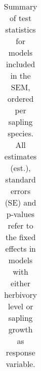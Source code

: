 \documentclass[10pt, twoside]{book} %
\begin{document}
\clearpage
\begin{landscape}
	\thispagestyle{empty}
\begin{table}
	\begin{center}
		\begin{footnotesize}
			\caption{Summary of test statistics for models included in the SEM, ordered per sapling species. All estimates (est.), standard errors (SE) and p-values refer to the fixed effects in models with either herbivory level or sapling growth as response variable.}  \label{tab5-1}
			
			\begingroup
			\setlength{\tabcolsep}{8pt} %
			\renewcommand{\arraystretch}{1.5} %
			\begin{tabular}{p{0.2cm} p{2cm} r r r r r r r r r p{0.001cm}}
				

\end{tabular}
\end{footnotesize}
\end{center}
\end{table}
\end{landscape}
\end{document}

